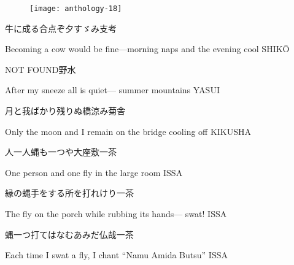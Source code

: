 \begin{figure}
    \texttt{[image: anthology-18]}
\end{figure}

\begin{haiku}
    {\FH 牛に成る合点ぞ夕すゞみ}\hfill{\FH 支考}

    \vin{} Becoming a cow
    \vin{} \vin{} would be fine---morning naps
    \vin{} \vin{} \vin{} and the evening cool \hspace{\fill} SHIK\={O}
\end{haiku}

\begin{haiku}
    NOT FOUND\hfill{\FH 野水}

    \vin{} After my sneeze
    \vin{} \vin{} all is quiet---
    \vin{} \vin{} \vin{} summer mountains \hspace{\fill} YASUI
\end{haiku}

\begin{haiku}
    {\FH 月と我ばかり残りぬ橋涼み}\hfill{\FH 菊舎}

    \vin{} Only the moon and I
    \vin{} \vin{} remain on the bridge
    \vin{} \vin{} \vin{} cooling off \hspace{\fill} KIKUSHA
\end{haiku}

\begin{haiku}
    {\FH 人一人蝿も一つや大座敷}\hfill{\FH 一茶}

    \vin{} One person
    \vin{} \vin{} and one fly
    \vin{} \vin{} \vin{} in the large room \hspace{\fill} ISSA
\end{haiku}

\begin{haiku}
    {\FH 縁の蝿手をする所を打れけり}\hfill{\FH 一茶}

    \vin{} The fly on the porch
    \vin{} \vin{} while rubbing its hands---
    \vin{} \vin{} \vin{} swat! \hspace{\fill} ISSA
\end{haiku}

\begin{haiku}
    {\FH 蝿一つ打てはなむあみだ仏哉}\hfill{\FH 一茶}

    \vin{} Each time
    \vin{} \vin{} I swat a fly, I chant
    \vin{} \vin{} \vin{} ``Namu Amida Butsu'' \hspace{\fill} ISSA
\end{haiku}

